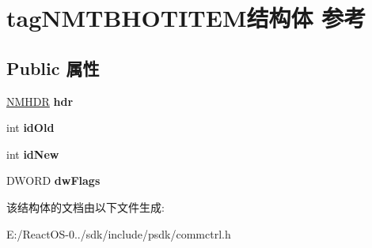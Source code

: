 \hypertarget{structtag_n_m_t_b_h_o_t_i_t_e_m}{}\section{tag\+N\+M\+T\+B\+H\+O\+T\+I\+T\+E\+M结构体 参考}
\label{structtag_n_m_t_b_h_o_t_i_t_e_m}
\subsection*{Public 属性}
\begin{DoxyCompactItemize}
\item 
\mbox{\label{structtag_n_m_t_b_h_o_t_i_t_e_m_a6d559026638bf668a775aafa6e5a0b56}} 
\hyperlink{structtag_n_m_h_d_r}{N\+M\+H\+DR} {\bfseries hdr}
\item 
\mbox{\label{structtag_n_m_t_b_h_o_t_i_t_e_m_a34c414662bdad88e71323fae92468314}} 
int {\bfseries id\+Old}
\item 
\mbox{\label{structtag_n_m_t_b_h_o_t_i_t_e_m_a31d8479b11a0085fc371e7404c2a0460}} 
int {\bfseries id\+New}
\item 
\mbox{\label{structtag_n_m_t_b_h_o_t_i_t_e_m_ad2fb3d3ea5c7fac9f2cd4933d895ee3f}} 
D\+W\+O\+RD {\bfseries dw\+Flags}
\end{DoxyCompactItemize}


该结构体的文档由以下文件生成\+:\begin{DoxyCompactItemize}
\item 
E\+:/\+React\+O\+S-\/0../sdk/include/psdk/commctrl.\+h\end{DoxyCompactItemize}

